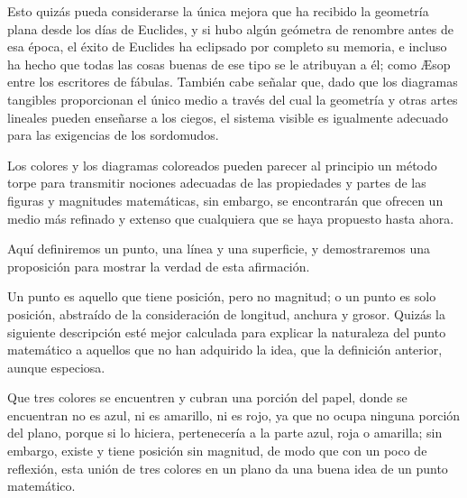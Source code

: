\documentclass[booklanguage=english]{byrnebook}
\begin{document}
\baselineskip

Esto quizás pueda considerarse la única mejora que ha recibido la geometría plana desde los días de Euclides, y si hubo algún geómetra de renombre antes de esa época, el éxito de Euclides ha eclipsado por completo su memoria, e incluso ha hecho que todas las cosas buenas de ese tipo se le atribuyan a él; como \AE sop entre los escritores de fábulas. También cabe señalar que, dado que los diagramas tangibles proporcionan el único medio a través del cual la geometría y otras artes lineales pueden enseñarse a los ciegos, el sistema visible es igualmente adecuado para las exigencias de los sordomudos.


Los colores y los diagramas coloreados pueden parecer al principio un método torpe para transmitir nociones adecuadas de las propiedades y partes de las figuras y magnitudes matemáticas, sin embargo, se encontrarán que ofrecen un medio más refinado y extenso que cualquiera que se haya propuesto hasta ahora.

Aquí definiremos un punto, una línea y una superficie, y demostraremos una proposición para mostrar la verdad de esta afirmación.

Un punto es aquello que tiene posición, pero no magnitud; o un punto es solo posición, abstraído de la consideración de longitud, anchura y grosor. Quizás la siguiente descripción esté mejor calculada para explicar la naturaleza del punto matemático a aquellos que no han adquirido la idea, que la definición anterior, aunque especiosa.

Que tres colores \drawCurrentPictureInMargin se encuentren y cubran una porción del papel, donde se encuentran no es azul, ni es amarillo, ni es rojo, ya que no ocupa ninguna porción del plano, porque si lo hiciera, pertenecería a la parte azul, roja o amarilla; sin embargo, existe y tiene posición sin magnitud, de modo que con un poco de reflexión, esta unión de tres colores en un plano da una buena idea de un punto matemático.
\end{document}
